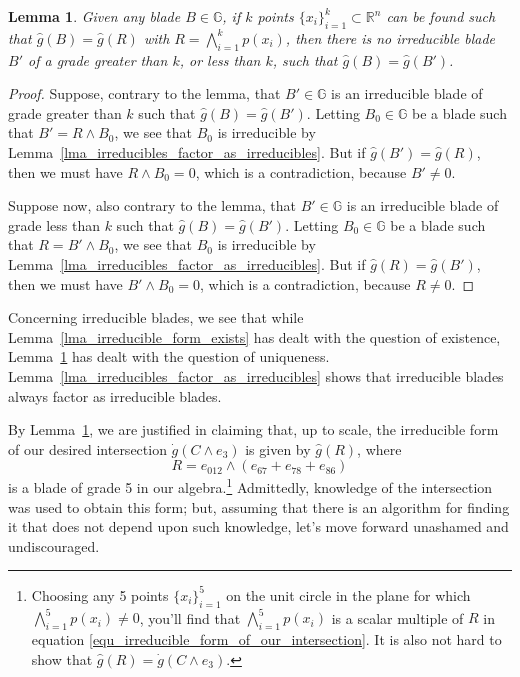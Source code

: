 \documentclass{birkjour}
\newtheorem{lem}[thm]{Lemma}
\theoremstyle{definition}
\theoremstyle{remark}
\numberwithin{equation}{section}
\newcommand{\R}{\mathbb{R}}
\newcommand{\G}{\mathbb{G}}
\newcommand{\gd}{\dot{g}}
\newcommand{\gh}{\hat{g}}
\begin{document}
\begin{lem}\label{lma_unique_grade_of_irreducible_form}
Given any blade $B\in\G$, if $k$ points $\{x_i\}_{i=1}^k\subset\R^n$ can be found
such that $\gh(B)=\gh(R)$ with $R=\bigwedge_{i=1}^k p(x_i)$, then there is no
irreducible blade $B'$ of a grade greater than $k$, or less than $k$, such that $\gh(B)=\gh(B')$.
\end{lem}
\begin{proof}
Suppose, contrary to the lemma, that $B'\in\G$ is an irreducible blade of grade greater than $k$ such that $\gh(B)=\gh(B')$.
Letting $B_0\in\G$ be a blade such that $B'=R\wedge B_0$, we see that $B_0$ is irreducible
by Lemma~\ref{lma_irreducibles_factor_as_irreducibles}.  But if $\gh(B')=\gh(R)$, then
we must have $R\wedge B_0=0$, which is a contradiction, because $B'\neq 0$.

Suppose now, also contrary to the lemma, that $B'\in\G$ is an irreducible blade of grade less than $k$ such that $\gh(B)=\gh(B')$.
Letting $B_0\in\G$ be a blade such that $R=B'\wedge B_0$, we see that $B_0$ is irreducible
by Lemma~\ref{lma_irreducibles_factor_as_irreducibles}.  But if $\gh(R)=\gh(B')$, then
we must have $B'\wedge B_0=0$, which is a contradiction, because $R\neq 0$.
\end{proof}

Concerning irreducible blades, we see that while Lemma~\ref{lma_irreducible_form_exists} has dealt with
the question of existence, Lemma~\ref{lma_unique_grade_of_irreducible_form} has dealt with the question of uniqueness.
Lemma~\ref{lma_irreducibles_factor_as_irreducibles} shows that irreducible blades always factor
as irreducible blades.

By Lemma~\ref{lma_unique_grade_of_irreducible_form}, we are justified in
claiming that, up to scale, the irreducible form of
our desired intersection $\gd(C\wedge e_3)$ is given by $\gh(R)$, where
\begin{equation}\label{equ_irreducible_form_of_our_intersection}
R = e_{012}\wedge(e_{67} + e_{78} + e_{86})
\end{equation}
is a blade of grade 5 in our algebra.\footnote{Choosing any 5 points $\{x_i\}_{i=1}^5$ on
the unit circle in the plane for which $\bigwedge_{i=1}^5 p(x_i)\neq 0$, you'll find that $\bigwedge_{i=1}^5 p(x_i)$
is a scalar multiple of $R$ in equation \eqref{equ_irreducible_form_of_our_intersection}.  It is also not
hard to show that $\gh(R)=\gd(C\wedge e_3)$.}
Admittedly, knowledge of the intersection was used
to obtain this form; but, assuming that there is an algorithm for finding it
that does not depend upon such knowledge, let's move forward unashamed
and undiscouraged.
\end{document}
